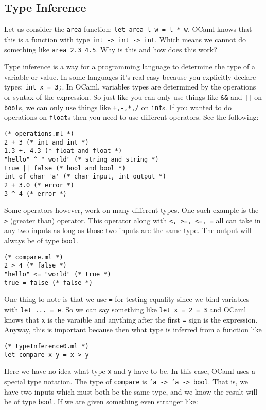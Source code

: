 \documentclass[main.tex]{subfiles}
\begin{document}
\subsection{Type Inference}
Let us consider the \texttt{area} function: \texttt{let area l w = l * w}. OCaml knows that this is a function with type \texttt{int -> int -> int}. Which means we cannot do something like \texttt{area 2.3 4.5}. Why is this and how does this work? 

Type inference is a way for a programming language to determine the type of a variable or value. In some languages it's real easy because you explicitly declare types: \texttt{int x = 3;}. In OCaml, variables types are determined by the operations or syntax of the expression. So just like you can only use things like \texttt{\&\&} and \texttt{||} on \texttt{bool}s, we can only use things like \texttt{+,-,*,/} on \texttt{int}s. If you wanted to do operations on \texttt{float}s then you need to use different operators. See the following:
\begin{lstlisting}[style=Myocamlstyle]
(* operations.ml *)
2 + 3 (* int and int *)
1.3 +. 4.3 (* float and float *)
"hello" ^ " world" (* string and string *)
true || false (* bool and bool *)
int_of_char 'a' (* char input, int output *)
2 + 3.0 (* error *)
3 ^ 4 (* error *)
\end{lstlisting}
Some operators however, work on many different types. One such example is the \texttt{>} (greater than) operator. This operator along with \texttt{<, >=, <=, =} all can take in any two inputs as long as those two inputs are the same type. The output will always be of type \texttt{bool}.
\begin{lstlisting}[style=Myocamlstyle]
(* compare.ml *)
2 > 4 (* false *)
"hello" <= "world" (* true *)
true = false (* false *)
\end{lstlisting}
One thing to note is that we use \texttt{=} for testing equality since we bind variables with \texttt{let ... = e}. So we can say something like \texttt{let x = 2 = 3} and OCaml knows that \texttt{x} is the varaible and anything after the first \texttt{=} sign is the expression. 
Anyway, this is important because then what type is inferred from a function like
\begin{lstlisting}[style=Myocamlstyle]
(* typeInference0.ml *)
let compare x y = x > y
\end{lstlisting}
Here we have no idea what type \texttt{x} and \texttt{y} have to be. In this case, OCaml uses a special type notation. The type of \texttt{compare} is \texttt{'a -> 'a -> bool}. That is, we have two inputs which must both be the same type, and we know the result will be of type \texttt{bool}. If we are given something even stranger like: 
\end{document}
